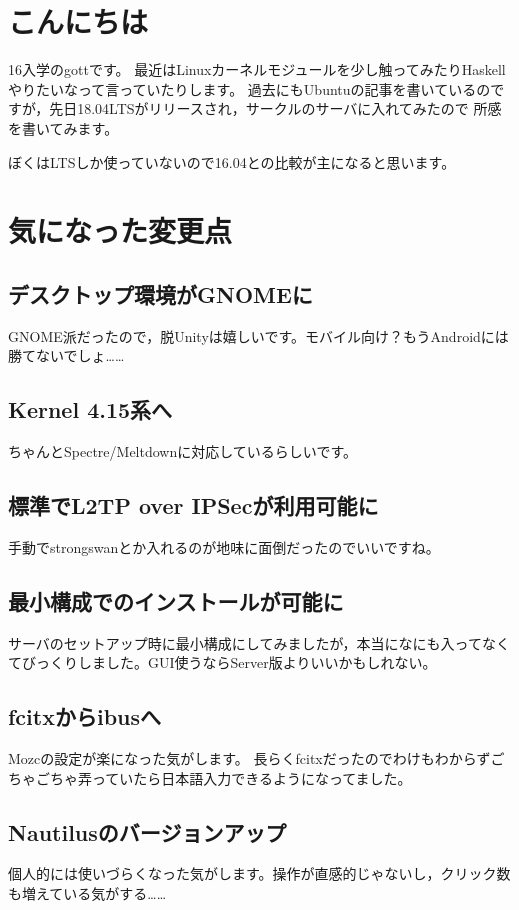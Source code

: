 
\section{こんにちは}
16入学のgottです。
最近はLinuxカーネルモジュールを少し触ってみたりHaskellやりたいなって言っていたりします。
過去にもUbuntuの記事を書いているのですが，先日18.04LTSがリリースされ，サークルのサーバに入れてみたので
所感を書いてみます。

ぼくはLTSしか使っていないので16.04との比較が主になると思います。

\section{気になった変更点}
\subsection{デスクトップ環境がGNOMEに}
GNOME派だったので，脱Unityは嬉しいです。モバイル向け？もうAndroidには勝てないでしょ……

\subsection{Kernel 4.15系へ}
ちゃんとSpectre/Meltdownに対応しているらしいです。

\subsection{標準でL2TP over IPSecが利用可能に}
手動でstrongswanとか入れるのが地味に面倒だったのでいいですね。

\subsection{最小構成でのインストールが可能に}
サーバのセットアップ時に最小構成にしてみましたが，本当になにも入ってなくてびっくりしました。GUI使うならServer版よりいいかもしれない。

\subsection{fcitxからibusへ}
Mozcの設定が楽になった気がします。
長らくfcitxだったのでわけもわからずごちゃごちゃ弄っていたら日本語入力できるようになってました。

\subsection{Nautilusのバージョンアップ}
個人的には使いづらくなった気がします。操作が直感的じゃないし，クリック数も増えている気がする……

